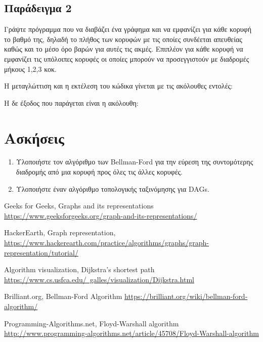 \subsection{Παράδειγμα 2}
Γράψτε πρόγραμμα που να διαβάζει ένα γράφημα και να εμφανίζει για κάθε κορυφή το βαθμό της, δηλαδή το πλήθος των κορυφών με τις οποίες συνδέεται απευθείας καθώς και το μέσο όρο βαρών για αυτές τις ακμές. Επιπλέον για κάθε κορυφή να εμφανίζει τις υπόλοιπες κορυφές οι οποίες μπορούν να προσεγγιστούν με διαδρομές μήκους 1,2,3 κοκ.



Η μεταγλώττιση και η εκτέλεση του κώδικα γίνεται με τις ακόλουθες εντολές:



Η δε έξοδος που παράγεται είναι η ακόλουθη:



\section{Ασκήσεις}
\begin{enumerate}
	\item Υλοποιήστε τον αλγόριθμο των Bellman-Ford \cite{brilliant_bellman_ford} για την εύρεση της συντομότερης διαδρομής από μια κορυφή προς όλες τις άλλες κορυφές.
	\item Υλοποιήστε έναν αλγόριθμο τοπολογικής ταξινόμησης για DAGs.
\end{enumerate}

\begin{thebibliography}{9}
Geeks for Geeks, Graphs and its representations \href{https://www.geeksforgeeks.org/graph-and-its-representations/}{https://www.geeksforgeeks.org/graph-and-its-representations/}

HackerEarth, Graph representation, \href{https://www.hackerearth.com/practice/algorithms/graphs/graph-representation/tutorial/}{https://www.hackerearth.com/practice/algorithms/graphs/graph-representation/tutorial/}

Algorithm visualization, Dijkstra's shortest path \href{https://www.cs.usfca.edu/~galles/visualization/Dijkstra.html}{https://www.cs.usfca.edu/~galles/visualization/Dijkstra.html}

Brilliant.org, Bellman-Ford Algorithm \href{https://brilliant.org/wiki/bellman-ford-algorithm/}{https://brilliant.org/wiki/bellman-ford-algorithm/}

Programming-Algorithms.net, Floyd-Warshall algorithm \href{http://www.programming-algorithms.net/article/45708/Floyd-Warshall-algorithm}{http://www.programming-algorithms.net/article/45708/Floyd-Warshall-algorithm}

\end{thebibliography}
